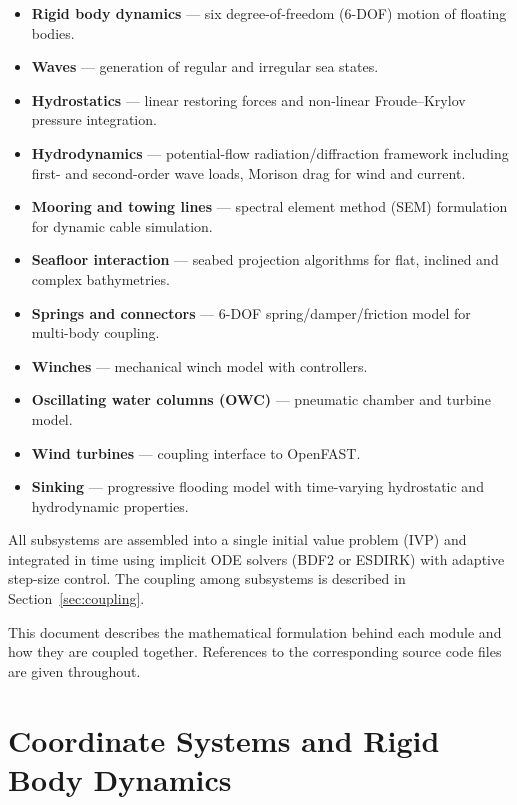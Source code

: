 \documentclass[11pt]{article}
\begin{document}
\begin{itemize}
    \item \textbf{Rigid body dynamics} --- six degree-of-freedom (6-DOF) motion of floating bodies.
    \item \textbf{Waves} --- generation of regular and irregular sea states.
    \item \textbf{Hydrostatics} --- linear restoring forces and non-linear Froude--Krylov pressure integration.
    \item \textbf{Hydrodynamics} --- potential-flow radiation/diffraction framework including first- and second-order wave loads, Morison drag for wind and current.
    \item \textbf{Mooring and towing lines} --- spectral element method (SEM) formulation for dynamic cable simulation.
    \item \textbf{Seafloor interaction} --- seabed projection algorithms for flat, inclined and complex bathymetries.
    \item \textbf{Springs and connectors} --- 6-DOF spring/damper/friction model for multi-body coupling.
    \item \textbf{Winches} --- mechanical winch model with controllers.
    \item \textbf{Oscillating water columns (OWC)} --- pneumatic chamber and turbine model.
    \item \textbf{Wind turbines} --- coupling interface to OpenFAST.
    \item \textbf{Sinking} --- progressive flooding model with time-varying hydrostatic and hydrodynamic properties.
\end{itemize}

All subsystems are assembled into a single initial value problem (IVP) and integrated in time using implicit ODE solvers (BDF2 or ESDIRK) with adaptive step-size control. The coupling among subsystems is described in Section~\ref{sec:coupling}.

This document describes the mathematical formulation behind each module and how they are coupled together. References to the corresponding source code files are given throughout.

\section{Coordinate Systems and Rigid Body Dynamics}
\label{sec:bodies}
\end{document}
